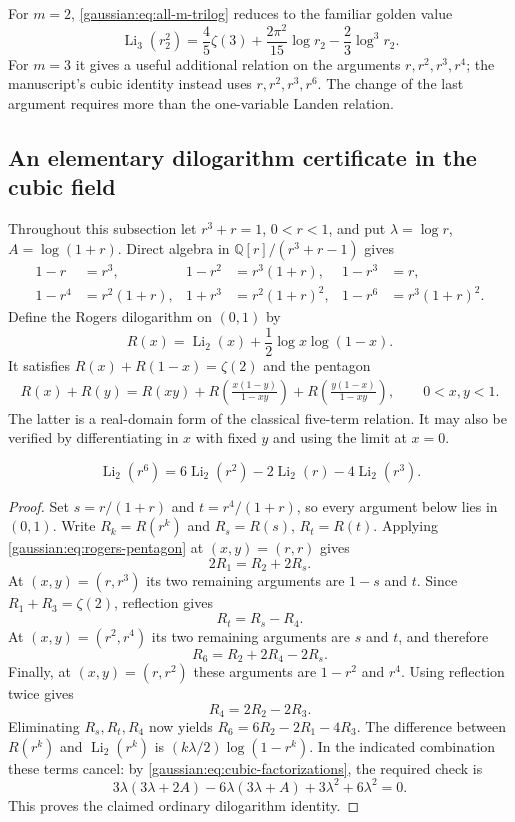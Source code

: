For $m=2$, \eqref{gaussian:eq:all-m-trilog} reduces to the familiar golden value
\[
\operatorname{Li}_3(r_2^2)
 =\frac45\zeta(3)+\frac{2\pi^2}{15}\log r_2
 -\frac23\log^3r_2.
\]
For $m=3$ it gives a useful additional relation on the arguments
$r,r^2,r^3,r^4$; the manuscript's cubic identity instead uses
$r,r^2,r^3,r^6$. The change of the last argument requires more than
the one-variable Landen relation.

\subsection{An elementary dilogarithm certificate in the cubic field}

Throughout this subsection let $r^3+r=1$, $0<r<1$, and put
$\lambda=\log r$, $A=\log(1+r)$. Direct algebra in
$\mathbb Q[r]/(r^3+r-1)$ gives
\begin{align}
1-r&=r^3,&1-r^2&=r^3(1+r),&1-r^3&=r,\\
1-r^4&=r^2(1+r),&1+r^3&=r^2(1+r)^2,
 &1-r^6&=r^3(1+r)^2.
\label{gaussian:eq:cubic-factorizations}
\end{align}
Define the Rogers dilogarithm on $(0,1)$ by
\[
R(x)=\operatorname{Li}_2(x)+\frac12\log x\log(1-x).
\]
It satisfies $R(x)+R(1-x)=\zeta(2)$ and the pentagon
\begin{align}
R(x)+R(y)
 =R(xy)+R\!\left(\frac{x(1-y)}{1-xy}\right)
  +R\!\left(\frac{y(1-x)}{1-xy}\right),\qquad 0<x,y<1.
\label{gaussian:eq:rogers-pentagon}
\end{align}
The latter is a real-domain form of the classical five-term relation.
It may also be verified by differentiating in $x$ with fixed $y$ and
using the limit at $x=0$.

\begin{lemma}
\label{gaussian:lem:cubic-dilog}
\begin{equation}
\operatorname{Li}_2(r^6)
 =6\operatorname{Li}_2(r^2)-2\operatorname{Li}_2(r)
  -4\operatorname{Li}_2(r^3).
\label{gaussian:eq:cubic-dilog}
\end{equation}
\end{lemma}

\begin{proof}
Set $s=r/(1+r)$ and $t=r^4/(1+r)$, so every argument below lies
in $(0,1)$. Write $R_k=R(r^k)$ and $R_s=R(s)$, $R_t=R(t)$.
Applying \eqref{gaussian:eq:rogers-pentagon} at $(x,y)=(r,r)$ gives
\[
2R_1=R_2+2R_s.
\]
At $(x,y)=(r,r^3)$ its two remaining arguments are $1-s$ and $t$.
Since $R_1+R_3=\zeta(2)$, reflection gives
\[
R_t=R_s-R_4.
\]
At $(x,y)=(r^2,r^4)$ its two remaining arguments are $s$ and $t$,
and therefore
\[
R_6=R_2+2R_4-2R_s.
\]
Finally, at $(x,y)=(r,r^2)$ these arguments are $1-r^2$ and $r^4$.
Using reflection twice gives
\[
R_4=2R_2-2R_3.
\]
Eliminating $R_s,R_t,R_4$ now yields
$R_6=6R_2-2R_1-4R_3$. The difference between $R(r^k)$ and
$\operatorname{Li}_2(r^k)$ is
$(k\lambda/2)\log(1-r^k)$. In the indicated combination these
terms cancel: by \eqref{gaussian:eq:cubic-factorizations}, the required check is
\[
3\lambda(3\lambda+2A)
 -6\lambda(3\lambda+A)+3\lambda^2+6\lambda^2=0.
\]
This proves the claimed ordinary dilogarithm identity.
\end{proof}

